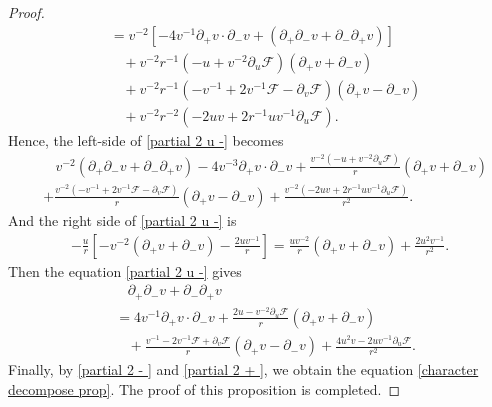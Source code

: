 \documentclass[10pt,leqno]{amsart}
\numberwithin{equation}{section}
\begin{document}
\begin{proof}
\begin{equation}
\begin{aligned}
			& =  v^{-2} [ -4 v^{-1}\partial_{+} v \cdot \partial_{-} v  + (\partial_{+} \partial_{-} v + \partial_{-} \partial_{+} v) ]\\
			& \ \ \ \ + v^{-2} r^{-1} (-u + v^{-2}\partial_{u} \mathcal{F}) ( \partial_{+} v + \partial_{-} v )  \\
			& \ \ \ \ + v^{-2}  r^{-1} ( -v^{-1} + 2v^{-1}\mathcal{F} - \partial_{v} \mathcal{F} ) (\partial_{+} v - \partial_{-}v) \\
			& \ \ \ \ + v^{-2} r^{-2} (-2uv + 2r^{-1}uv^{-1}\partial_{u} \mathcal{F}) .
		\end{aligned}
	\end{equation}
	Hence, the left-side of \eqref{partial 2 u -} becomes	
	\begin{equation*} 
		\begin{aligned}
			& \ \ \ \ v^{-2} (\partial_{+} \partial_{-} v + \partial_{-} \partial_{+} v) -4 v^{-3}\partial_{+} v \cdot \partial_{-} v +   \frac{v^{-2} (-u + v^{-2}\partial_{u} \mathcal{F})}{r}  ( \partial_{+} v + \partial_{-} v )  \\
			& + \frac{v^{-2} ( -v^{-1} + 2v^{-1}\mathcal{F} - \partial_{v} \mathcal{F} ) }{r}  ( \partial_{+} v - \partial_{-} v ) + \frac{v^{-2} (-2uv + 2r^{-1}uv^{-1}\partial_{u} \mathcal{F}) }{r^2} .
		\end{aligned}
	\end{equation*}		
	And the right side of \eqref{partial 2 u -} is	
	\begin{equation*}
		\begin{aligned}
			- \frac{u}{r} \left[  -v^{-2} (\partial_{+} v + \partial_{-} v ) -  \frac{2uv^{-1}}{r}   \right]  =  \frac{ uv^{-2} }{r} (\partial_{+}v + \partial_{-}v) + \frac{2u^2 v^{-1}}{r^2}  .
		\end{aligned}
	\end{equation*}	
	Then the equation \eqref{partial 2 u -} gives
	\begin{equation} \label{partial 2 + }
		\begin{aligned}
			& \ \ \ \ \partial_{+} \partial_{-} v + \partial_{-} \partial_{+} v \\
			& = 4v^{-1} \partial_{+}v \cdot \partial_{-}v + \frac{2u - v^{-2} \partial_{u} \mathcal{F}}{r} (\partial_{+}v + \partial_{-}v) \\
			& \ \ \ \ + \frac{v^{-1}-2v^{-1} \mathcal{F} + \partial_{v} \mathcal{F}}{r} (\partial_{+}v - \partial_{-}v)   + \frac{4u^2 v - 2uv^{-1}\partial_{u} \mathcal{F} }{r^{2}} .
		\end{aligned}
	\end{equation}	
	Finally, by \eqref{partial 2 - } and \eqref{partial 2 + }, we obtain the equation \eqref{character decompose prop}. The proof of this proposition is completed.
\end{proof}
\end{document}

